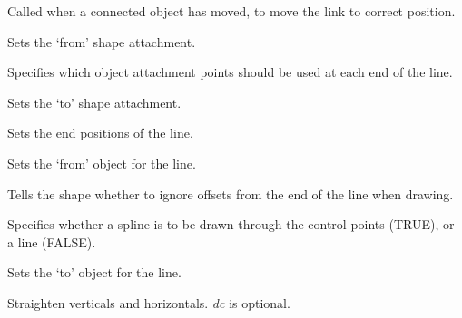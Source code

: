Called when a connected object has moved, to move the link to
correct position.



Sets the `from' shape attachment.



Specifies which object attachment points should be used at each end of the line.



Sets the `to' shape attachment.



Sets the end positions of the line.



Sets the `from' object for the line.



Tells the shape whether to ignore offsets from the end of the line when drawing.



Specifies whether a spline is to be drawn through the control points (TRUE), or a line (FALSE).



Sets the `to' object for the line.



Straighten verticals and horizontals. {\it dc} is optional.

